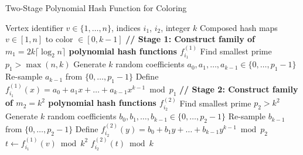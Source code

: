 \documentclass{article}
\begin{document}
\begin{algorithm}[H]
    \caption{Two-Stage Polynomial Hash Function for Coloring}
    \begin{algorithmic}[1]
        \Require Vertex identifier $v \in \{1, \ldots, n\}$, indices $i_1$, $i_2$, integer $k$
        \Ensure Composed hash maps $v \in [1, n]$ to color $\in [0, k-1]$
        \Statex
        \State \textbf{// Stage 1: Construct family of $m_1 = 2k\lceil \log_2 n \rceil$ polynomial hash functions $f^{(1)}_{i_1}$}
        \State Find smallest prime $p_1 > \max(n, k)$
            \State Generate $k$ random coefficients $a_0, a_1, \ldots, a_{k-1} \in \{0, \ldots, p_1 - 1\}$
                \State Re-sample $a_{k-1}$ from $\{0, \ldots, p_1 - 1\}$
            \EndWhile
            \State Define $f^{(1)}_{i_1}(x) = a_0 + a_1 x + \ldots + a_{k-1}x^{k-1} \bmod p_1$
        \EndFor
        \Statex
        \State \textbf{// Stage 2: Construct family of $m_2 = k^2$ polynomial hash functions $f^{(2)}_{i_2}$}
        \State Find smallest prime $p_2 > k^2$
            \State Generate $k$ random coefficients $b_0, b_1, \ldots, b_{k-1} \in \{0, \ldots, p_2 - 1\}$
                \State Re-sample $b_{k-1}$ from $\{0, \ldots, p_2 - 1\}$
            \EndWhile
            \State Define $f^{(2)}_{i_2}(y) = b_0 + b_1 y + \ldots + b_{k-1}y^{k-1} \bmod p_2$
        \EndFor
        \Statex
            \State $t \gets f^{(1)}_{i_1}(v) \bmod k^2$
            \State \Return $f^{(2)}_{i_2}(t) \bmod k$
        \EndFunction
    \end{algorithmic}
    \end{algorithm}
    
\end{document}
